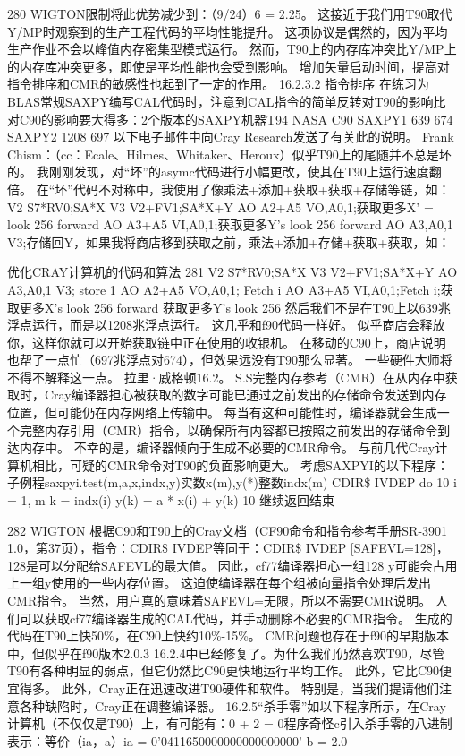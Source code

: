 \documentclass[UTF8,11pt,a4paper,openany,fontset=fandol]{ctexbook}
\begin{document}
280 WIGTON限制将此优势减少到：（9/24）6 = 2.25。 这接近于我们用T90取代Y/MP时观察到的生产工程代码的平均性能提升。 这项协议是偶然的，因为平均生产作业不会以峰值内存密集型模式运行。 然而，T90上的内存库冲突比Y/MP上的内存库冲突更多，即使是平均性能也会受到影响。 增加矢量启动时间，提高对指令排序和CMR的敏感性也起到了一定的作用。 16.2.3.2 指令排序 在练习为BLAS常规SAXPY编写CAL代码时，注意到CAL指令的简单反转对T90的影响比对C90的影响要大得多：2个版本的SAXPY机器T94 NASA C90 SAXPY1 639 674 SAXPY2 1208 697 以下电子邮件中向Cray Research发送了有关此的说明。 Frank Chism：（cc：Ecale、Hilmes、Whitaker、Heroux）似乎T90上的尾随并不总是坏的。 我刚刚发现，对“坏”的asymc代码进行小幅更改，使其在T90上运行速度翻倍。 在“坏”代码不对称中，我使用了像乘法+添加+获取+获取+存储等链，如：V2 S7*RV0;SA*X V3 V2+FV1;SA*X+Y AO A2+A5 VO,A0,1;获取更多X' = look 256 forward AO A3+A5 VI,A0,1;获取更多Y's look 256 forward AO A3,A0,1 V3;存储回Y，如果我将商店移到获取之前，乘法+添加+存储+获取+获取，如：

优化CRAY计算机的代码和算法 281 V2 S7*RV0;SA*X V3 V2+FV1;SA*X+Y AO A3,A0,1 V3; store 1 AO A2+A5 VO,A0,1; Fetch i AO A3+A5 VI,A0,1;Fetch i;获取更多X's look 256 forward 获取更多Y's look 256 然后我们不是在T90上以639兆浮点运行，而是以1208兆浮点运行。 这几乎和f90代码一样好。 似乎商店会释放你，这样你就可以开始获取链中正在使用的收银机。 在移动的C90上，商店说明也帮了一点忙（697兆浮点对674），但效果远没有T90那么显著。 一些硬件大师将不得不解释这一点。 拉里·威格顿16.2。 S.S完整内存参考（CMR）在从内存中获取时，Cray编译器担心被获取的数字可能已通过之前发出的存储命令发送到内存位置，但可能仍在内存网络上传输中。 每当有这种可能性时，编译器就会生成一个完整内存引用（CMR）指令，以确保所有内容都已按照之前发出的存储命令到达内存中。 不幸的是，编译器倾向于生成不必要的CMR命令。 与前几代Cray计算机相比，可疑的CMR命令对T90的负面影响更大。 考虑SAXPYI的以下程序：子例程saxpyi.test(m,a,x,indx,y)实数x(m),y(*)整数indx(m) CDIR\$ IVDEP do 10 i = 1, m k = indx(i) y(k) = a * x(i) + y(k) 10 继续返回结束

282 WIGTON 根据C90和T90上的Cray文档（CF90命令和指令参考手册SR-3901 1.0，第37页），指令：CDIR\$ IVDEP等同于：CDIR\$ IVDEP [SAFEVL=128]，128是可以分配给SAFEVL的最大值。 因此，cf77编译器担心一组128 y可能会占用上一组y使用的一些内存位置。 这迫使编译器在每个组被向量指令处理后发出CMR指令。 当然，用户真的意味着SAFEVL=无限，所以不需要CMR说明。 人们可以获取cf77编译器生成的CAL代码，并手动删除不必要的CMR指令。 生成的代码在T90上快50\%，在C90上快约10\%-15\%。 CMR问题也存在于f90的早期版本中，但似乎在f90版本2.0.3 16.2.4中已经修复了。为什么我们仍然喜欢T90，尽管T90有各种明显的弱点，但它仍然比C90更快地运行平均工作。 此外，它比C90便宜得多。 此外，Cray正在迅速改进T90硬件和软件。 特别是，当我们提请他们注意各种缺陷时，Cray正在调整编译器。 16.2.5“杀手零”如以下程序所示，在Cray计算机（不仅仅是T90）上，有可能有：0 + 2 = 0程序奇怪c引入杀手零的八进制表示：等价（ia，a）ia = 0'0411650000000000000000' b = 2.0
\end{document}
